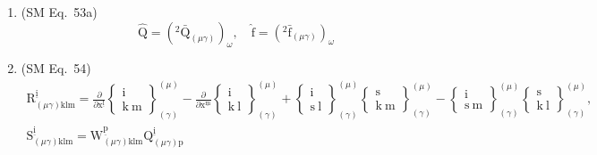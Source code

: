 \documentclass[12pt]{article}
\begin{document}
\begin{enumerate}[label=(\arabic*), series=formellist]
    \item (SM Eq.\ 53a) 
    \[
    \widehat{\mathrm{Q}} = \left( {}^2\bar{\mathrm{Q}}_{(\mu\gamma)} \right)_\omega, \quad \hat{\mathrm{f}} = \left( {}^2\bar{\mathrm{f}}_{(\mu\gamma)} \right)_\omega
    \]

    \item (SM Eq.\ 54) 
    \[
    \begin{gathered}
    \mathrm{R}^{\underline{\mathrm{i}}}_{(\mu\gamma)\mathrm{klm}} = \frac{\partial}{\partial \mathrm{x}^{\underline{\mathrm{l}}}}\left\{ \begin{smallmatrix} \mathrm{i} \\ \mathrm{k\ m} \end{smallmatrix} \right\}^{(\mu)}_{(\gamma)} - \frac{\partial}{\partial \mathrm{x}^{\underline{\mathrm{m}}}}\left\{ \begin{smallmatrix} \mathrm{i} \\ \mathrm{k\ l} \end{smallmatrix} \right\}^{(\mu)}_{(\gamma)} + \left\{ \begin{smallmatrix} \mathrm{i} \\ \mathrm{s\ l} \end{smallmatrix} \right\}^{(\mu)}_{(\gamma)}\left\{ \begin{smallmatrix} \mathrm{s} \\ \mathrm{k\ m} \end{smallmatrix} \right\}^{(\mu)}_{(\gamma)} - \left\{ \begin{smallmatrix} \mathrm{i} \\ \mathrm{s\ m} \end{smallmatrix} \right\}^{(\mu)}_{(\gamma)}\left\{ \begin{smallmatrix} \mathrm{s} \\ \mathrm{k\ l} \end{smallmatrix} \right\}^{(\mu)}_{(\gamma)}, \\
    \mathrm{S}^{\underline{\mathrm{i}}}_{(\mu\gamma)\mathrm{klm}} = \mathrm{W}^{\underline{\mathrm{p}}}_{(\mu\gamma)\mathrm{klm}} \mathrm{Q}^{\underline{\mathrm{i}}}_{(\mu\gamma)\mathrm{p}}
    \end{gathered}
    \]


\end{enumerate}
\end{document}
